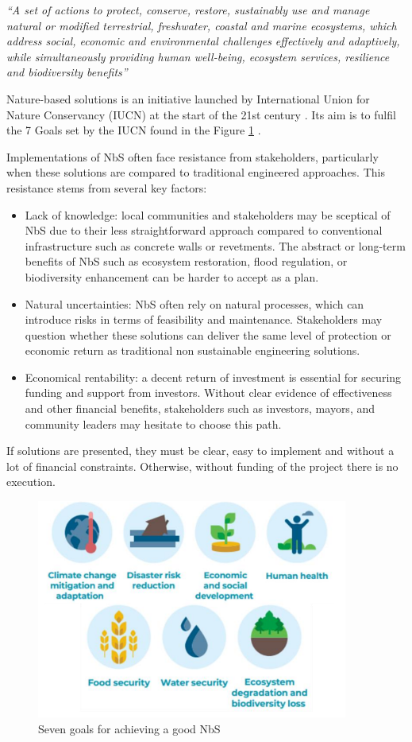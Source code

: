 \textit{“A set of actions to protect, conserve, restore, sustainably
use and manage natural or modified terrestrial, freshwater, coastal and marine
ecosystems, which address social, economic and environmental challenges
effectively and adaptively, while simultaneously providing human well-being,
ecosystem services, resilience and biodiversity benefits” \autocite{eiselinVerenigdeNatiesStemmen2022}}

Nature-based solutions is an initiative launched by International Union for Nature Conservancy (IUCN) at the start of the 21st century \autocite{cassinChapter2History2021}. Its aim is to fulfil the 7 Goals set by the IUCN found in the Figure \ref{fig:7g} \autocite{dunlopEvolutionFutureResearch2024}.

Implementations of NbS often face resistance from stakeholders, particularly when these solutions are compared to traditional engineered approaches. This resistance stems from several key factors:
\begin{itemize}
    \item Lack of knowledge: local communities and stakeholders may be sceptical of NbS due to their less straightforward approach compared to conventional infrastructure such as concrete walls or revetments. The abstract or long-term benefits of NbS such as ecosystem restoration, flood regulation, or biodiversity enhancement can be harder to accept as a plan.
    \item Natural uncertainties: NbS often rely on natural processes, which can introduce risks in terms of feasibility and maintenance. Stakeholders may question whether these solutions can deliver the same level of protection or economic return as traditional non sustainable engineering solutions.
    \item Economical rentability: a decent return of investment is essential for securing funding and support from investors. Without clear evidence of effectiveness and other financial benefits, stakeholders such as investors, mayors, and community leaders may hesitate to choose this path.
\end{itemize}

If solutions are presented, they must be clear, easy to implement and without a lot of financial constraints. Otherwise, without funding of the project there is no execution.

\begin{figure}[H]
    \centering
    \includegraphics[width=0.50\linewidth]{figures/ThesevenNBSgoals.png}
    \caption{Seven goals for achieving a good NbS \autocite{dunlopEvolutionFutureResearch2024}}
    \label{fig:7g}
\end{figure}